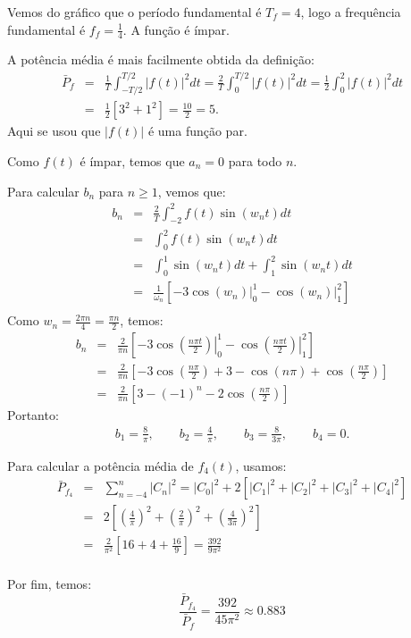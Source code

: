 \begin{resol}
  
  Vemos do gráfico que o período fundamental é $T_f=4$, logo a frequência fundamental é $f_f = \frac{1}{4}$. A função é ímpar.

  A potência média é mais facilmente obtida da definição:
  \begin{eqnarray*}
      \bar{P}_f&=&\frac{1}{T}\int_{-T/2}^{T/2}|f(t)|^2dt
      =\frac{2}{T}\int_{0}^{T/2}|f(t)|^2dt
      =\frac{1}{2}\int_{0}^{2}|f(t)|^2dt\\
      &=&\frac{1}{2}\left[3^2+1^2\right]=\frac{10}{2}=5.
  \end{eqnarray*}
  Aqui se usou que $|f(t)|$ é uma função par.
  
  Como $f(t)$ é ímpar, temos que $a_n=0$ para todo $n$.
  
  Para calcular $b_n$ para $n\geq 1$, vemos que:
  \begin{eqnarray*}
     b_n&=&\frac{2}{T}\int_{-2}^2f(t)\sin(w_n t)dt\\
     &=&\int_{0}^2f(t)\sin(w_n t)dt\\
     &=&\int_{0}^1\sin(w_n t)dt+\int_{1}^2\sin(w_n t)dt\\
     &=&\frac{1}{\omega_n}\left[-3\left.\cos(w_n)\right|_0^1-\left.\cos(w_n)\right|_1^2\right]\\
  \end{eqnarray*}
  Como $w_n = \frac{2\pi n}{4}=\frac{\pi n}{2}$, temos:
  \begin{eqnarray*}
      b_n    &=&\frac{2}{\pi n}\left[-3\left.\cos\left(\frac{n\pi t}{2}\right)\right|_0^1-\left.\cos\left(\frac{n\pi t}{2}\right)\right|_1^2\right]\\
             &=&\frac{2}{\pi n}\left[-3\cos\left(\frac{n\pi }{2}\right)+3-\cos\left({n\pi }\right) + \cos\left(\frac{n\pi }{2}\right)\right]\\            
             &=&\frac{2}{\pi n}\left[3-(-1)^n-2\cos\left(\frac{n\pi }{2}\right) \right]
   \end{eqnarray*}
  Portanto:
  \begin{eqnarray*}
      b_1    =\frac{8}{\pi},\qquad
      b_2    =\frac{4}{\pi},\qquad
      b_3    =\frac{8}{3\pi},\qquad
      b_4    =0.
   \end{eqnarray*}
   
   Para calcular a potência média de $f_4(t)$, usamos:
   \begin{eqnarray*}
      \bar{P}_{f_4} &=& \sum_{n=-4}^n|C_n|^2 = |C_0|^2+2\left[|C_1|^2+|C_2|^2+|C_3|^2+|C_4|^2\right]\\
      &=&2\left[\left(\frac{4}{\pi}\right)^2 + \left(\frac{2}{\pi}\right)^2+ \left(\frac{4}{3\pi}\right)^2\right]\\
      &=&\frac{2}{\pi^2}\left[16+4+\frac{16}{9}\right]=\frac{392}{9\pi^2}\\
   \end{eqnarray*}

   Por fim, temos:
   $$\frac{\bar{P}_{f_4}}{\bar{P}_f}=\frac{392}{45\pi^2}\approx 0.883$$

\end{resol}


